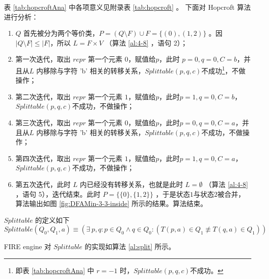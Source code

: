 表 \ref{tab:hopcroftAna} 中各项意义见附录表 \ref{tab:hopcroft} 。
下面对 Hopcroft 算法进行分析：
\begin{enumerate}[(1)]
    \item $Q$ 首先被分为两个等价类，$P=(Q\setminus F) \cup F = \{(0),(1,2)\}$ 。因 $|Q\setminus F|\le |F|$，所以 $L=F\times V$ （算法 \ref{al:4-8} ，语句 2）；
    \item 第一次迭代，取出 $repr$ 第一个元素 $0$，赋值给$p$，此时 $p=0,q=0,C=b$，并且从$L$ 内移除与字符 'b' 相关的转移关系，$Splittable(p,q,c)$不成功\footnote{ 即表 \ref{tab:hopcroftAna} 中 $r=-1$ 时，$Splittable(p,q,c)$不成功。}，不做操作；
    \item 第二次迭代，取出 $repr$ 第一个元素 $1$，赋值给$p$，此时$p=1,q=0,C=b$，$Splittable(p,q,c)$不成功，不做操作；
    \item 第三次迭代，取出 $repr$ 第一个元素 $0$，赋值给$p$，此时$p=0,q=0,C=a$，并且从$L$ 内移除与字符 'b' 相关的转移关系，$Splittable(p,q,c)$不成功，不做操作；
    \item 第四次迭代，取出 $repr$ 第一个元素 $1$，赋值给$p$，此时$p=1,q=0,C=a$，$Splittable(p,q,c)$不成功，不做操作；
    \item 第五次迭代，此时 $L$ 内已经没有转移关系，也就是此时 $L=\emptyset$ （算法 \ref{al:4-8} ，语句 5），迭代结束。此时 $P=\{ \{0\},\{1,2\} \}$ ，于是状态$1$与状态$2$被合并，算法输出如图 \ref{fig:DFAMin-3-3-inside} 所示的结果。算法结束。
\end{enumerate}

\begin{definition}
    $Splittable$ 的定义如下
    \[  Splittable(Q_0 ,Q_1, a) \equiv ( \exists ~ p,q : p \in Q_0 \land q \in Q_0 : ( T(p,a) \in Q_1 \not\equiv T(q,a) \in Q_1  ) ) \]
\end{definition}



FIRE engine 对 $Splittable$ 的实现如算法 \ref{al:split} 所示。

